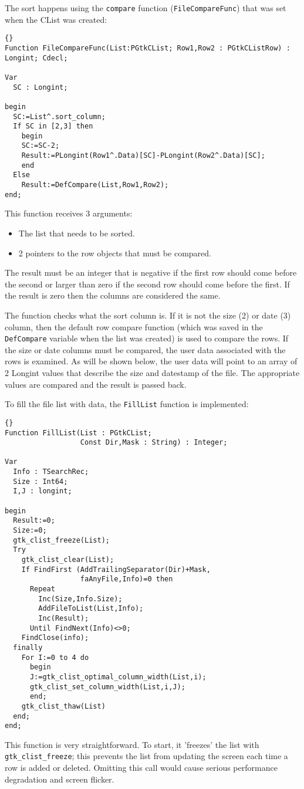 \documentclass[10pt]{article}
\begin{document}
The sort happens using the \lstinline|compare| function (\lstinline|FileCompareFunc|)
that was set when the CList was created:
\begin{lstlisting}{}
Function FileCompareFunc(List:PGtkCList; Row1,Row2 : PGtkCListRow) : Longint; Cdecl;

Var 
  SC : Longint;

begin
  SC:=List^.sort_column;
  If SC in [2,3] then
    begin
    SC:=SC-2;
    Result:=PLongint(Row1^.Data)[SC]-PLongint(Row2^.Data)[SC];
    end
  Else
    Result:=DefCompare(List,Row1,Row2);  
end;
\end{lstlisting}
This function receives 3 arguments:
\begin{itemize}
\item The list that needs to be sorted.
\item 2 pointers to the row objects that must be compared.
\end{itemize}
The result must be an integer that is negative if the first row should come
before the second or larger than zero if the second row should come before
the first. If the result is zero then the columns are considered the same.

The function checks what the sort column is. If it is not the size (2) or 
date (3) column, then the default row compare function (which was saved in 
the \lstinline|DefCompare| variable when the list was created) is used to
compare the rows. If the size or date columns must be compared, the user 
data associated with the rows is examined. As will be shown below, the user
data will point to an array of 2 Longint values that describe the size and
datestamp of the file. The appropriate values are compared and the result is 
passed back.

To fill the file list with data, the \lstinline|FillList| function is 
implemented:
\begin{lstlisting}{}
Function FillList(List : PGtkCList; 
                  Const Dir,Mask : String) : Integer;

Var
  Info : TSearchRec;
  Size : Int64;
  I,J : longint;
  
begin
  Result:=0;
  Size:=0;
  gtk_clist_freeze(List);
  Try
    gtk_clist_clear(List);
    If FindFirst (AddTrailingSeparator(Dir)+Mask,
                  faAnyFile,Info)=0 then
      Repeat
        Inc(Size,Info.Size);
        AddFileToList(List,Info);
        Inc(Result);
      Until FindNext(Info)<>0;
    FindClose(info);
  finally
    For I:=0 to 4 do
      begin
      J:=gtk_clist_optimal_column_width(List,i);
      gtk_clist_set_column_width(List,i,J);
      end;
    gtk_clist_thaw(List)
  end;
end;
\end{lstlisting}
This function is very straightforward. To start, it 'freezes' the list with
\lstinline|gtk_clist_freeze|; this prevents the list from updating the
screen each time a row is added or deleted. Omitting this call would cause
serious performance degradation and screen flicker.
\end{document}
